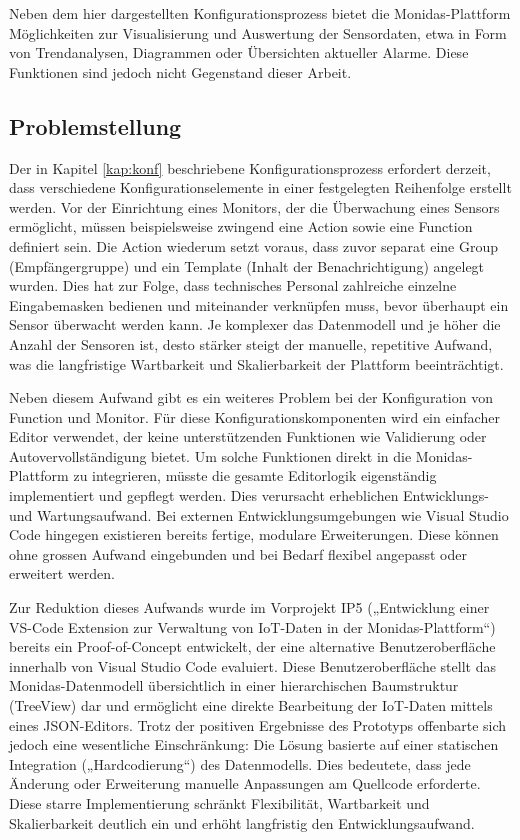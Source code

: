 Neben dem hier dargestellten Konfigurationsprozess bietet die Monidas-Plattform Möglichkeiten zur Visualisierung und Auswertung der Sensordaten, etwa in Form von Trendanalysen, Diagrammen oder Übersichten aktueller Alarme. Diese Funktionen sind jedoch nicht Gegenstand dieser Arbeit.

\subsection{Problemstellung}
Der in Kapitel \ref{kap:konf} beschriebene Konfigurationsprozess erfordert derzeit, dass verschiedene Konfigurationselemente in einer festgelegten Reihenfolge erstellt werden. Vor der Einrichtung eines Monitors, der die Überwachung eines Sensors ermöglicht, müssen beispielsweise zwingend eine Action sowie eine Function definiert sein. Die Action wiederum setzt voraus, dass zuvor separat eine Group (Empfängergruppe) und ein Template (Inhalt der Benachrichtigung) angelegt wurden. Dies hat zur Folge, dass technisches Personal zahlreiche einzelne Eingabemasken bedienen und miteinander verknüpfen muss, bevor überhaupt ein Sensor überwacht werden kann. Je komplexer das Datenmodell und je höher die Anzahl der Sensoren ist, desto stärker steigt der manuelle, repetitive Aufwand, was die langfristige Wartbarkeit und Skalierbarkeit der Plattform beeinträchtigt.

Neben diesem Aufwand gibt es ein weiteres Problem bei der Konfiguration von Function und Monitor. Für diese Konfigurationskomponenten wird ein einfacher Editor verwendet, der keine unterstützenden Funktionen wie Validierung oder Autovervollständigung bietet. Um solche Funktionen direkt in die Monidas-Plattform zu integrieren, müsste die gesamte Editorlogik eigenständig implementiert und gepflegt werden. Dies verursacht erheblichen Entwicklungs- und Wartungsaufwand. Bei externen Entwicklungsumgebungen wie Visual Studio Code hingegen existieren bereits fertige, modulare Erweiterungen. Diese können ohne grossen Aufwand eingebunden und bei Bedarf flexibel angepasst oder erweitert werden.

Zur Reduktion dieses Aufwands wurde im Vorprojekt IP5 („Entwicklung einer VS-Code Extension zur Verwaltung von IoT-Daten in der Monidas-Plattform“) bereits ein Proof-of-Concept entwickelt, der eine alternative Benutzeroberfläche innerhalb von Visual Studio Code evaluiert. Diese Benutzeroberfläche stellt das Monidas-Datenmodell übersichtlich in einer hierarchischen Baumstruktur (TreeView) dar und ermöglicht eine direkte Bearbeitung der IoT-Daten mittels eines JSON-Editors. Trotz der positiven Ergebnisse des Prototyps offenbarte sich jedoch eine wesentliche Einschränkung: Die Lösung basierte auf einer statischen Integration („Hardcodierung“) des Datenmodells. Dies bedeutete, dass jede Änderung oder Erweiterung manuelle Anpassungen am Quellcode erforderte. Diese starre Implementierung schränkt Flexibilität, Wartbarkeit und Skalierbarkeit deutlich ein und erhöht langfristig den Entwicklungsaufwand.

